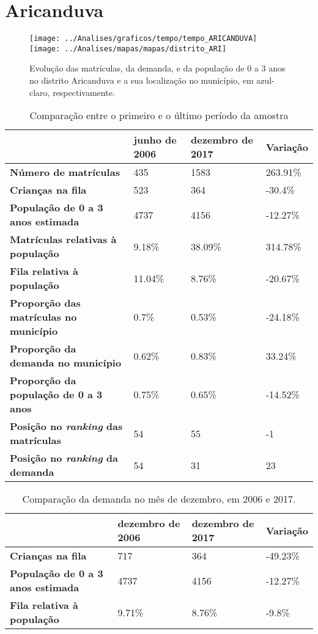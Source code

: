 \section{Aricanduva}
\begin{figure}[H]
\centering
\texttt{[image: ../Analises/graficos/tempo/tempo\_ARICANDUVA]}
\texttt{[image: ../Analises/mapas/mapas/distrito\_ARI]}
\caption{Evolução das matrículas, da demanda, e da população de 0 a 3 anos no distrito Aricanduva e a sua localização no município, em azul-claro, respectivamente.}
\end{figure}
\begin{table}[H]
\begin{tabular}{l|l|l|l}
\textbf{}                                      & \textbf{junho de 2006}       & \textbf{dezembro de 2017}    & \textbf{Variação} \\ \hline
\textbf{Número de matrículas}                  & 435 & 1583 & 263.91\% \\ \hline
\textbf{Crianças na fila}                      & 523 & 364 & -30.4\% \\ \hline
\textbf{População de 0 a 3 anos estimada}      & 4737 & 4156 & -12.27\% \\ \hline
\textbf{Matrículas relativas à população}      & 9.18\% & 38.09\% & 314.78\% \\ \hline
\textbf{Fila relativa à população}             & 11.04\% & 8.76\% & -20.67\% \\ \hline
\textbf{Proporção das matrículas no município} & 0.7\% & 0.53\% & -24.18\% \\ \hline
\textbf{Proporção da demanda no município}     & 0.62\% & 0.83\% & 33.24\% \\ \hline
\textbf{Proporção da população de 0 a 3 anos}  & 0.75\% & 0.65\% & -14.52\% \\ \hline
\textbf{Posição no \textit{ranking} das matrículas}     & 54 & 55 & -1 \\ \hline
\textbf{Posição no \textit{ranking} da demanda}         & 54 & 31 & 23 \\ 
\end{tabular}
\caption{Comparação entre o primeiro e o último período da amostra}
\end{table}
\begin{table}[H]
\begin{tabular}{l|l|l|l}
\textbf{}                                 & \textbf{dezembro de 2006} & \textbf{dezembro de 2017} & \textbf{Variação} \\ \hline
\textbf{Crianças na fila}                      & 717 & 364 & -49.23\% \\ \hline
\textbf{População de 0 a 3 anos estimada}      & 4737 & 4156 & -12.27\% \\ \hline
\textbf{Fila relativa à população}             & 9.71\% & 8.76\% & -9.8\% \\
\end{tabular}
\caption{Comparação da demanda no mês de dezembro, em 2006 e 2017.}
\end{table}
